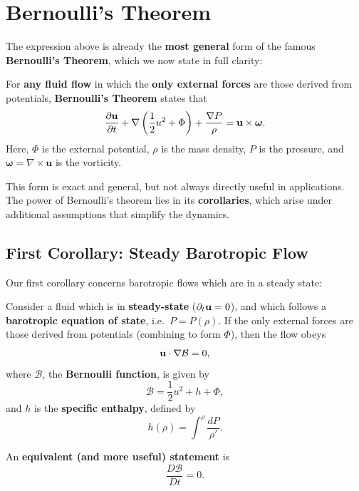 \section{Bernoulli's Theorem}

The expression above is already the \textbf{most general} form of the famous \textbf{Bernoulli's Theorem}, which we now state in full clarity:

\vspace{0.5cm}
\begin{theorem}
For \textbf{any fluid flow} in which the \textbf{only external forces} are those derived from potentials, \textbf{Bernoulli's Theorem} states that
\begin{equation}
    \label{eq:bernoulli-general}
    \frac{\partial {\bf u}}{\partial t} 
    + \nabla\left(\frac{1}{2}u^2 + \Phi\right) 
    + \frac{\nabla P}{\rho} 
    = {\bf u} \times \boldsymbol{\omega}.
\end{equation}
Here, $\Phi$ is the external potential, $\rho$ is the mass density, $P$ is the pressure, and $\boldsymbol{\omega} = \nabla \times \mathbf{u}$ is the vorticity. 
\end{theorem}
\vspace{0.5cm}

This form is exact and general, but not always directly useful in applications. The power of Bernoulli’s theorem lies in its \textbf{corollaries}, which arise under additional assumptions that simplify the dynamics.

\subsection{First Corollary: Steady Barotropic Flow}

Our first corollary concerns barotropic flows which are in a steady state:
\vspace{0.5cm}
\begin{corollary}
Consider a fluid which is in \textbf{steady-state} ($\partial_t {\bf u} = 0$), and which follows a \textbf{barotropic equation of state}, i.e.\ $P = P(\rho)$. If the only external forces are those derived from potentials (combining to form $\Phi$), then the flow obeys
\begin{equation}
    \label{eq:bernoulli-steady}
    {\bf u} \cdot \nabla \mathcal{B} = 0,
\end{equation}
where $\mathcal{B}$, the \textbf{Bernoulli function}, is given by
\[
\mathcal{B} = \frac{1}{2}u^2 + h + \Phi,
\]
and $h$ is the \textbf{specific enthalpy}, defined by
\[
h(\rho) = \int^\rho \frac{dP}{\rho'}.
\]
\par
An \textbf{equivalent (and more useful) statement} is
\[
\boxed{
\frac{D\mathcal{B}}{Dt} = 0.
}
\]
\end{corollary}


